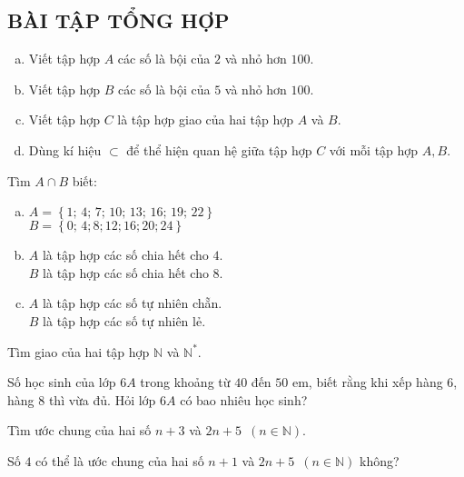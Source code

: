 \begin{bt}
\subsection{BÀI TẬP TỔNG HỢP}
\end{bt}   \begin{bt}
\begin{enumerate}[a)]
\item Viết tập hợp $A$ các số là bội của $2$ và nhỏ hơn $100$.
\item Viết tập hợp $B$ các số là bội của $5$ và nhỏ hơn $100$.
\item Viết tập hợp $C$ là tập hợp  giao của hai tập hợp $A$ và $B$.
\item Dùng kí hiệu $ \subset $ để thể hiện quan hệ giữa tập hợp $C$ với mỗi tập hợp $A, B$.
\end{enumerate}
\end{bt}   \begin{bt}
Tìm $A \cap B$ biết:
\begin{enumerate}[a)]
\item $A = \left\{ {1;\,4;\,7;\,10;\,13;\,16;\,19;\,22} \right\}$\\
\qquad $B = \left\{ {0;\,4;8;12;16;20;24} \right\}$
\item $A$ là tập hợp các số chia hết cho $4$.\\
\qquad $B$ là tập hợp các số chia hết cho $8$.
\item $A$ là tập hợp các số tự nhiên chẵn.\\
\qquad $B$ là tập hợp các số tự nhiên lẻ.
\end{enumerate}
\end{bt}   \begin{bt}
Tìm giao của hai tập hợp $\mathbb{N}$ và $\mathbb{N^*}$.
\end{bt}   \begin{bt}
Số học sinh của lớp $6A$ trong khoảng từ $40$ đến $50$ em, biết rằng khi xếp hàng $6$, hàng $8$ thì vừa đủ. Hỏi lớp $6A$ có bao nhiêu học sinh?
\end{bt}   \begin{bt}
Tìm ước chung của hai số $n + 3$ và $2n + 5$ \,$\left( {n \in \mathbb{N}} \right)$.
\end{bt}   \begin{bt}
Số $4$ có thể là ước chung của hai số $n + 1$ và $2n + 5$ \,$\left( {n \in \mathbb{N}} \right)$ không?
\end{bt} 
